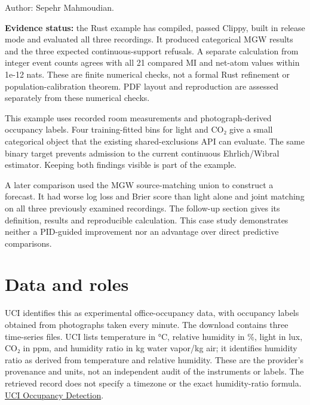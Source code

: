 Author: Sepehr Mahmoudian.

\textbf{Evidence status:} the Rust example has compiled, passed Clippy, built in release mode and evaluated all three recordings. It produced categorical MGW results and the three expected continuous-support refusals. A separate calculation from integer event counts agrees with all 21 compared MI and net-atom values within 1e-12 nats. These are finite numerical checks, not a formal Rust refinement or population-calibration theorem. PDF layout and reproduction are assessed separately from these numerical checks.

This example uses recorded room measurements and photograph-derived occupancy labels. Four training-fitted bins for light and CO₂ give a small categorical object that the existing shared-exclusions API can evaluate. The same binary target prevents admission to the current continuous Ehrlich/Wibral estimator. Keeping both findings visible is part of the example.

A later comparison used the MGW source-matching union to construct a forecast. It had worse log loss and Brier score than light alone and joint matching on all three previously examined recordings. The follow-up section gives its definition, results and reproducible calculation. This case study demonstrates neither a PID-guided improvement nor an advantage over direct predictive comparisons.

\par{}

\section{Data and roles}\label{data-and-roles}

UCI identifies this as experimental office-occupancy data, with occupancy labels obtained from photographs taken every minute. The download contains three time-series files. UCI lists temperature in °C, relative humidity in \%, light in lux, CO₂ in ppm, and humidity ratio in kg water vapor/kg air; it identifies humidity ratio as derived from temperature and relative humidity. These are the provider's provenance and units, not an independent audit of the instruments or labels. The retrieved record does not specify a timezone or the exact humidity-ratio formula. \href{https://archive.ics.uci.edu/dataset/357/occupancy+detection}{UCI Occupancy Detection}.

